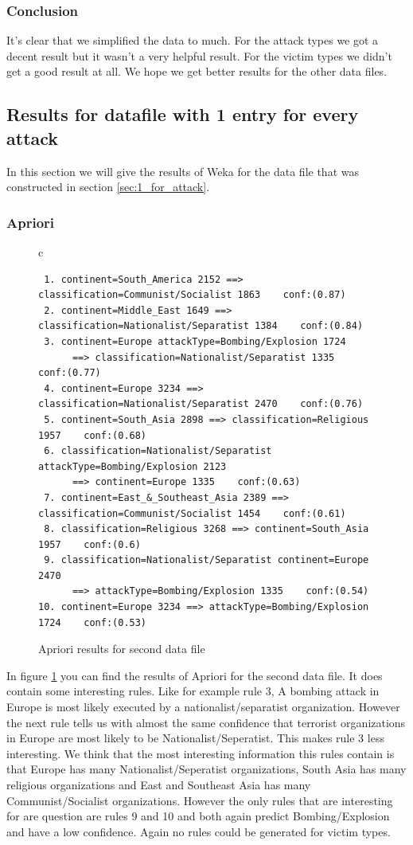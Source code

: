 \documentclass[a4]{article}
\begin{document}
\subsubsection{Conclusion}
It's clear that we simplified the data to much. For the attack types we got a decent result but it wasn't a very helpful result. For the victim types we didn't get a good result at all. We hope we get better results for the other data files.
\subsection{Results for datafile with 1 entry for every attack}
In this section we will give the results of Weka for the data file that was constructed in section \ref{sec:1_for_attack}.
\subsubsection{Apriori}
\begin{figure}[!h]
\begin{tabular}{c}
\begin{lstlisting}
 1. continent=South_America 2152 ==> classification=Communist/Socialist 1863    conf:(0.87)
 2. continent=Middle_East 1649 ==> classification=Nationalist/Separatist 1384    conf:(0.84)
 3. continent=Europe attackType=Bombing/Explosion 1724 
      ==> classification=Nationalist/Separatist 1335    conf:(0.77)
 4. continent=Europe 3234 ==> classification=Nationalist/Separatist 2470    conf:(0.76)
 5. continent=South_Asia 2898 ==> classification=Religious 1957    conf:(0.68)
 6. classification=Nationalist/Separatist attackType=Bombing/Explosion 2123 
      ==> continent=Europe 1335    conf:(0.63)
 7. continent=East_&_Southeast_Asia 2389 ==> classification=Communist/Socialist 1454    conf:(0.61)
 8. classification=Religious 3268 ==> continent=South_Asia 1957    conf:(0.6)
 9. classification=Nationalist/Separatist continent=Europe 2470 
      ==> attackType=Bombing/Explosion 1335    conf:(0.54)
10. continent=Europe 3234 ==> attackType=Bombing/Explosion 1724    conf:(0.53)
\end{lstlisting}
\end{tabular}
\caption{Apriori results for second data file}
\label{fig:apriori_2}
\end{figure}
In figure \ref{fig:apriori_2} you can find the results of Apriori for the second data file. It does contain some interesting rules. Like for example rule 3, A bombing attack in Europe is most likely executed by a nationalist/separatist organization. However the next rule tells us with almost the same confidence that terrorist organizations in Europe are most likely to be Nationalist/Seperatist. This makes rule 3 less interesting. We think that the most interesting information this rules contain is that Europe has many Nationalist/Seperatist organizations, South Asia has many religious organizations and East and Southeast Asia has many Communist/Socialist organizations. However the only rules that are interesting for are question are rules 9 and 10 and both again predict Bombing/Explosion and have a low confidence. Again no rules could be generated for victim types.\par
\end{document}
